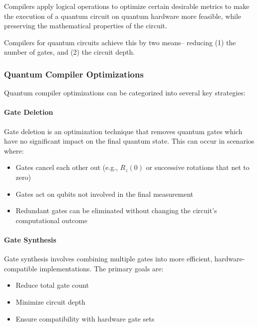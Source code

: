 Compilers apply logical operations to optimize certain desirable metrics to make
the execution of a quantum circuit on quantum hardware more feasible, while
preserving the mathematical properties of the circuit.

Compilers for quantum circuits achieve this by two means-- reducing (1) the
number of gates, and (2) the circuit depth.

\subsubsection*{Quantum Compiler Optimizations}

Quantum compiler optimizations can be categorized into several key strategies:

\paragraph{Gate Deletion}
Gate deletion is an optimization technique that removes quantum gates which
have no significant impact on the final quantum state. This can occur in
scenarios where:

\begin{itemize}
  \item Gates cancel each other out (e.g., $R_z(0)$ or successive rotations
    that net to zero)

  \item Gates act on qubits not involved in the final measurement

  \item Redundant gates can be eliminated without changing the circuit's
    computational outcome
\end{itemize}



\paragraph{Gate Synthesis}
Gate synthesis involves combining multiple gates into more efficient,
hardware-compatible implementations. The primary goals are:

\begin{itemize}
  \item Reduce total gate count

  \item Minimize circuit depth

  \item Ensure compatibility with hardware gate sets
\end{itemize}

